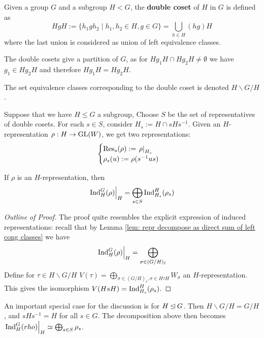 \documentclass{article}
\begin{document}
\begin{definition}
    Given a group $G$ and a subgroup $H < G$, the \textbf{double coset} of $H$ in $G$ is defined as
    \[
        HgH := \{ h_1 g h_2 \mid h_1, h_2 \in H, g \in G \} = \bigcup_{h \in H} (hg) H
    \]
    where the last union is considered as union of left equivalence classes.
\end{definition}

\begin{remark}
    The double cosets give a partition of $G$, as for $H g_1 H \cap H g_2 H \neq \emptyset$ we have $g_1 \in H g_2 H$ and therefore $H g_1 H = H g_2 H$.
\end{remark}

\begin{notation}
    The set equivalence classes corresponding to the double coset is denoted $H \backslash G / H$.
\end{notation}

Suppose that we have $H \leq G$ a subgroup, Choose $S$ be the set of representatives of double cosets. For each $s \in S$, consider $H_s := H \cap s H s^{-1}$. Given an $H$-representation $\rho: H \to \mathrm{GL}(W)$, we get two representations:
\[
    \begin{cases}
        \mathrm{Res}_s (\rho) := \left.\rho\right|_{H_s} \\
        \rho_s(u) := \rho(s^{-1} u s)
    \end{cases}
\]

\begin{theorem}\label{thm: decomposition of restrction of induced repr}
    If $\rho$ is an $H$-representation, then
    \[
        \left.\mathrm{Ind}_H^G (\rho)\right|_{H} = \bigoplus_{s \in S} \mathrm{Ind}_{H_s}^H (\rho_s)
    \]
\end{theorem}

\begin{proof}[Outline of Proof]
    The proof quite resembles the explicit expression of induced representations: recall that by Lemma \ref{lem: repr decompose as direct sum of left cong classes} we have
    \[
        \left.\mathrm{Ind}_H^G (\rho)\right|_{H} = \bigoplus_{\sigma \in (G/H)_{\ell}}
    \]
    Define for $\tau \in H\backslash G/H$ $V(\tau) = \bigoplus_{\sigma \in (G/H)_{\ell}, \sigma \in H\tau H} W_{\sigma}$ an $H$-representation. This gives the isomorphism $V(HsH) = \mathrm{Ind}_{H_s}^H (\rho_s)$.
\end{proof}

\begin{remark}
    An important special case for the discussion is for $H \unlhd G$. Then $H \backslash G/H = G/H$, and $sHs^{-1} = H$ for all $s \in G$. The decomposition above then becomes $\left.\mathrm{Ind}_H^G (rho)\right|_{H} \simeq \bigoplus_{s \in S} \rho_s$.
\end{remark}
\end{document}
